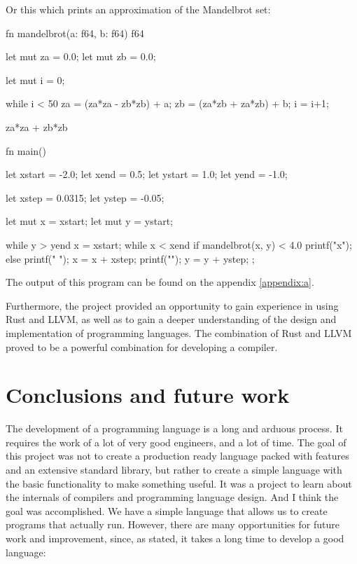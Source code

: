 ﻿\documentclass[10pt,a4paper,twocolumn,twoside]{article}
\begin{document}
Or this which prints an approximation of the Mandelbrot set:

\begin{code}
fn mandelbrot(a: f64, b: f64) f64 {
    let mut za = 0.0;
    let mut zb = 0.0;

    let mut i = 0;

    while i < 50 {
        za = (za*za - zb*zb) + a;
        zb = (za*zb + za*zb) + b;
        i = i+1;
    }

    za*za + zb*zb
}

fn main() {
    let xstart = -2.0;
    let xend = 0.5;
    let ystart = 1.0;
    let yend = -1.0;

    let xstep = 0.0315;
    let ystep = -0.05;

    let mut x = xstart;
    let mut y = ystart;

    while y > yend {
        x = xstart;
        while x < xend {
            if mandelbrot(x, y) < 4.0 {
                printf("x");
            } else {
                printf(" ");
            }
            x = x + xstep; 
        }
        printf("\n");
        y = y + ystep;
    };
}
\end{code}

The output of this program can be found on the appendix \ref{appendix:a}.

Furthermore, the project provided an opportunity to gain experience in using
Rust and LLVM, as well as to gain a deeper understanding of the design and
implementation of programming languages. The combination of Rust and LLVM proved
to be a powerful combination for developing a compiler.

\section{Conclusions and future work}
The development of a programming language is a long and arduous process. It
requires the work of a lot of very good engineers, and a lot of time. The goal
of this project was not to create a production ready language packed with
features and an extensive standard library, but rather to create a simple
language with the basic functionality to make something useful. It was a project
to learn about the internals of compilers and programming language design. And I
think the goal was accomplished. We have a simple language that allows us to
create programs that actually run. However, there are many opportunities for
future work and improvement, since, as stated, it takes a long time to develop a
good language:
\end{document}

